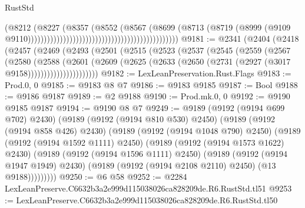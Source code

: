 \begin{lexlean}{RustStd}
\begin{coremodule}
                                                                              (@8212
                                                                                (@8227
                                                                                  (@8357
                                                                                    (@8552
                                                                                      (@8567
                                                                                        (@8699
                                                                                          (@8713
                                                                                            (@8719
                                                                                              (@8999
                                                                                                (@9109
                                                                                                  @9110)))))))))))))))))))))))))))))))))))))))))))))))
@9181 := @2341
    (@2404
      (@2418
        (@2457
          (@2469
            (@2493
              (@2501
                (@2515
                  (@2523
                    (@2537
                      (@2545
                        (@2559
                          (@2567
                            (@2580
                              (@2588
                                (@2601
                                  (@2609
                                    (@2625
                                      (@2633 (@2650 (@2731 (@2927 (@3017 @9158))))))))))))))))))))))
@9182 := LexLeanPreservation.Rust.Flags
@9183 := Prod.{0, 0}
@9185 := @9183 @8 @7
@9186 := @9183 @9185
@9187 := Bool
@9188 := @9186 @9187
@9189 := @2 @9188
@9190 := Prod.mk.{0, 0}
@9192 := @9190 @9185 @9187
@9194 := @9190 @8 @7
@9249 := @9189
    (@9192 (@9194 @699 @702) @2430)
    (@9189
      (@9192 (@9194 @810 @530) @2450)
      (@9189
        (@9192 (@9194 @858 @426) @2430)
        (@9189
          (@9192 (@9194 @1048 @790) @2450)
          (@9189
            (@9192 (@9194 @1592 @1111) @2450)
            (@9189
              (@9192 (@9194 @1573 @1622) @2430)
              (@9189
                (@9192 (@9194 @1596 @1111) @2450)
                (@9189
                  (@9192 (@9194 @1947 @1949) @2430)
                  (@9189 (@9192 (@9194 @2108 @2110) @2450) (@13 @9188)))))))))
@9250 := @6 @58
@9252 := @2284 LexLeanPreserve.C6632b3a2e999d115038026ca828209de.R6.RustStd.tl51
@9253 := LexLeanPreserve.C6632b3a2e999d115038026ca828209de.R6.RustStd.tl50

\end{coremodule}
\end{lexlean}
